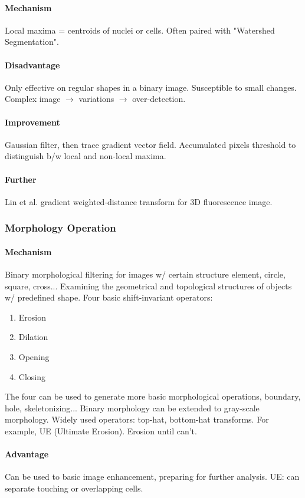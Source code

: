 \documentclass[10pt,a4paper]{article}
\begin{document}
\paragraph{Mechanism}Local maxima = centroids of nuclei or cells. Often paired with "Watershed Segmentation".
\paragraph{Disadvantage}Only effective on regular shapes in a binary image. Susceptible to small changes. Complex image $\to$ variations $\to$ over-detection.
\paragraph{Improvement}Gaussian filter, then trace gradient vector field. Accumulated pixels threshold to distinguish b/w local and non-local maxima.
\paragraph{Further}Lin et al. gradient weighted-distance transform for 3D fluorescence image.

\subsubsection{Morphology Operation}
\paragraph{Mechanism}Binary morphological filtering for images w/ certain structure element, circle, square, cross... Examining the geometrical and topological structures of objects w/ predefined shape. Four basic shift-invariant operators:
\begin{enumerate}
	\item Erosion
	\item Dilation
	\item Opening
	\item Closing
\end{enumerate}
The four can be used to generate more basic morphological operations, boundary, hole, skeletonizing... Binary morphology can be extended to gray-scale morphology. Widely used operators: top-hat, bottom-hat transforms. For example, UE (Ultimate Erosion). Erosion until can't.
\paragraph{Advantage}Can be used to basic image enhancement, preparing for further analysis. UE: can separate touching or overlapping cells.
\end{document}
